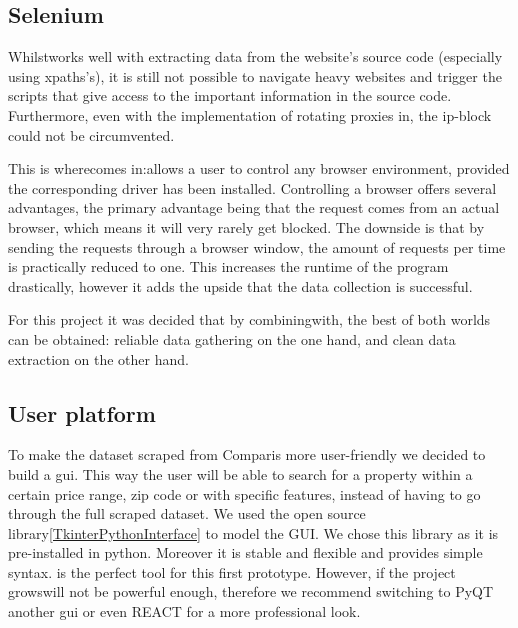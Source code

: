 \documentclass[main]{subfiles}
\begin{document}
\subsection{Selenium}
Whilst\pkg[Scrapy] works well with extracting data from the website's source code (especially using \acsp*{xpath}'s), 
it is still not possible to navigate \js heavy websites and trigger the scripts that give access to the important information in the source code.
Furthermore, even with the implementation of rotating proxies in\pkg[Scrapy], the \acs*{ip}-block could not be circumvented.

This is where\pkg[Selenium] comes in:\pkg[Selenium] allows a user to control any browser environment,
provided the corresponding driver has been installed.
Controlling a browser offers several advantages, the primary advantage being that the request comes from an actual browser,
which means it will very rarely get blocked. 
The downside is that by sending the requests through a browser window, 
the amount of requests per time is practically reduced to one.
This increases the runtime of the program drastically, 
however it adds the upside that the data collection is successful.

For this project it was decided that by combining\pkg[Selenium] with\pkg[Scrapy], the best of both worlds can be obtained:
reliable data gathering on the one hand, and clean data extraction on the other hand.


\subsection{User platform}
To make the dataset scraped from Comparis more user-friendly we decided to build a \ac{gui}.
This way the user will be able to search for a property within a certain price range, zip code or with specific features, 
instead of having to go through the full scraped dataset.
We used the open source library\pkg[tkinter] \ref{TkinterPythonInterface} to model the GUI. We chose this library as it is pre-installed in python.
Moreover it is stable and flexible and provides simple syntax.
\pkg[tkinter] is the perfect tool for this first prototype. However, if the project grows\pkg[tkinter] will not be powerful enough,
therefore we recommend switching to PyQT another \ac{gui} or even REACT for a more professional look. 
\end{document}
